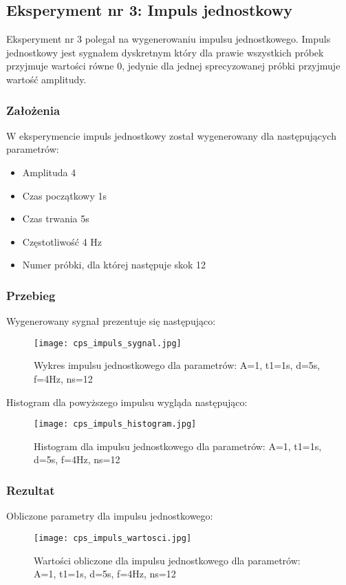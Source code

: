 \documentclass[12pt]{article}
\begin{document}

\newpage
\subsection{Eksperyment nr 3: Impuls jednostkowy}

Eksperyment nr 3 polegał na wygenerowaniu impulsu jednostkowego. Impuls jednostkowy jest sygnałem dyskretnym który dla prawie wszystkich próbek przyjmuje wartości równe 0, jedynie dla jednej sprecyzowanej próbki przyjmuje wartość amplitudy.
\subsubsection{Założenia}
W eksperymencie impuls jednostkowy został wygenerowany dla następujących parametrów:
\begin{itemize}
    \item Amplituda 4
    \item Czas początkowy 1s
    \item Czas trwania 5s
    \item Częstotliwość 4 Hz
    \item Numer próbki, dla której następuje skok 12
\end{itemize}
\subsubsection{Przebieg}
Wygenerowany sygnał prezentuje się następująco:
\begin{figure}[H]
    \centering
    \texttt{[image: cps\_impuls\_sygnal.jpg]}
    \caption{Wykres impulsu jednostkowego dla parametrów:  A=1, t1=1s, d=5s, f=4Hz, ns=12}
    \label{wykres dla eksperymentu 3}
\end{figure}

Histogram dla powyższego impulsu wygląda następująco:
\begin{figure}[H]
    \centering
    \texttt{[image: cps\_impuls\_histogram.jpg]}
    \caption{Histogram dla impulsu jednostkowego dla parametrów:  A=1, t1=1s, d=5s, f=4Hz, ns=12}
    \label{histogram dla eksperymentu 3}
\end{figure}


\subsubsection{Rezultat}
Obliczone parametry dla impulsu jednostkowego:
\begin{figure}[H]
    \centering
    \texttt{[image: cps\_impuls\_wartosci.jpg]}
    \caption{Wartości obliczone dla impulsu jednostkowego dla parametrów:  A=1, t1=1s, d=5s, f=4Hz, ns=12}
    \label{wartości dla eksperymentu 3}
\end{figure}
\end{document}
